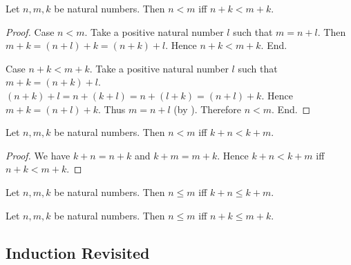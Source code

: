 \documentclass[10pt]{article}
\begin{document}
  \begin{forthel}
    \begin{proposition}[id=ARITHMETIC_04_7354062662008832,printid]
      Let $n, m, k$ be natural numbers.
      Then $n < m$ iff $n + k < m + k$.
    \end{proposition}
    \begin{proof}
      Case $n < m$.
        Take a positive natural number $l$ such that $m = n + l$.
        Then $m + k
          = (n + l) + k
          = (n + k) + l$.
        Hence $n + k < m + k$.
      End.

      Case $n + k < m + k$.
        Take a positive natural number $l$ such that $m + k = (n + k) + l$.
        $(n + k) + l
          = n + (k + l)
          = n + (l + k)
          = (n + l) + k$.
        Hence $m + k = (n + l) + k$.
        Thus $m = n + l$ (by ).
        Therefore $n < m$.
      End.
    \end{proof}
  \end{forthel}

  \begin{forthel}
    \begin{corollary}[id=ARITHMETIC_04_1901366129721344,printid]
      Let $n, m, k$ be natural numbers.
      Then $n < m$ iff $k + n < k + m$.
    \end{corollary}
    \begin{proof}
      We have $k + n = n + k$ and $k + m = m + k$.
      Hence $k + n < k + m$ iff $n + k < m + k$.
    \end{proof}
  \end{forthel}

  \begin{forthel}
    \begin{corollary}[id=ARITHMETIC_04_4203390999461888,printid]
      Let $n, m, k$ be natural numbers.
      Then $n \leq m$ iff $k + n \leq k + m$.
    \end{corollary}
  \end{forthel}

  \begin{forthel}
    \begin{corollary}[id=ARITHMETIC_04_5512590832697344,printid]
      Let $n, m, k$ be natural numbers.
      Then $n \leq m$ iff $n + k \leq m + k$.
    \end{corollary}
  \end{forthel}


  \subsection*{Induction Revisited}
\end{document}
